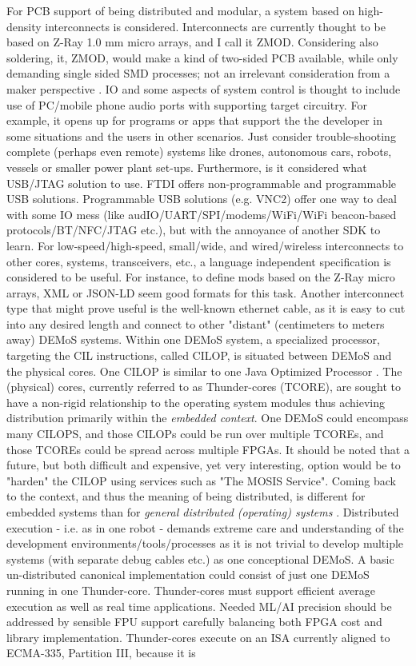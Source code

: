 \documentclass[11pt]{article}
\begin{document}
 For PCB support of being distributed and modular, a system based on high-density interconnects is considered. Interconnects are currently thought to be based on Z-Ray\textsuperscript{\textregistered} 1.0 mm micro arrays, and I call it ZMOD. Considering also soldering, it, ZMOD, would make a kind of two-sided PCB available, while only demanding single sided SMD processes; not an irrelevant consideration from a maker perspective \cite{Hatch2014}. IO and some aspects of system control is thought to include use of PC/mobile phone audio ports with supporting target circuitry. For example, it opens up for programs or apps that support the the developer in some situations and the users in other scenarios. Just consider trouble-shooting complete (perhaps even remote) systems like drones, autonomous cars, robots, vessels or smaller power plant set-ups. Furthermore, is it considered what USB/JTAG solution to use. FTDI offers non-programmable and programmable USB solutions. Programmable USB solutions (e.g. VNC2) offer one way to deal with some IO mess (like audIO/UART/SPI/modems/WiFi/WiFi beacon-based protocols/BT/NFC/JTAG etc.), but with the annoyance of another SDK to learn. For low-speed/high-speed, small/wide, and wired/wireless interconnects to other cores, systems, transceivers, etc., a language independent specification is considered to be useful. For instance, to define mods based on the Z-Ray\textsuperscript{\textregistered} micro arrays, XML or JSON-LD seem good formats for this task. Another interconnect type that might prove useful is the well-known ethernet cable, as it is easy to cut into any desired length and connect to other "distant" (centimeters to meters away) DEMoS systems. Within one DEMoS system, a specialized processor, targeting the CIL instructions, called CILOP, is situated between DEMoS and the physical cores. One CILOP is similar to one Java Optimized Processor \cite{Schoeberl2010}. The (physical) cores, currently referred to as Thunder-cores (TCORE), are sought to have a non-rigid relationship to the operating system modules thus achieving distribution primarily within the \textit{embedded context}. One DEMoS could encompass many CILOPS, and those CILOPs could be run over multiple TCOREs, and those TCOREs could be spread across multiple FPGAs. It should be noted that a future, but both difficult and expensive, yet very interesting, option would be to "harden" the CILOP using services such as "The MOSIS Service". Coming back to the context, and thus the meaning of being distributed, is different for embedded systems than for \textit{general distributed (operating) systems} \cite{Jul1987}. Distributed execution - i.e. as in one robot - demands extreme care and understanding of the development environments/tools/processes as it is not trivial to develop multiple systems (with separate debug cables etc.) as one conceptional DEMoS. A basic un-distributed canonical implementation could consist of just one DEMoS running in one Thunder-core. Thunder-cores must support efficient average execution as well as real time applications. Needed ML/AI precision should be addressed by sensible FPU \cite{IEEE2008} support carefully balancing both FPGA cost and library implementation. Thunder-cores execute on an ISA currently aligned to ECMA-335, Partition III, because it is 
\end{document}
